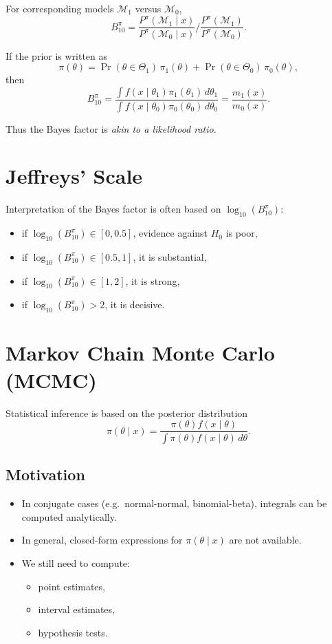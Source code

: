 \documentclass[12pt,oneside]{book}
\numberwithin{equation}{section}
\theoremstyle{definition}
\theoremstyle{plain}
\theoremstyle{remark}
\begin{document}
For corresponding models $\mathcal{M}_1$ versus $\mathcal{M}_0$,
\[
B^{\pi}_{10}
=
\frac{P^{\pi}(\mathcal{M}_1 \mid x)}{P^{\pi}(\mathcal{M}_0 \mid x)}
\Big/
\frac{P^{\pi}(\mathcal{M}_1)}{P^{\pi}(\mathcal{M}_0)}.
\]

If the prior is written as
\[
\pi(\theta)
=
\Pr(\theta \in \Theta_1)\,\pi_1(\theta)
+
\Pr(\theta \in \Theta_0)\,\pi_0(\theta),
\]
then
\[
B^{\pi}_{10}
=
\frac{\int f(x \mid \theta_1)\pi_1(\theta_1)\, d\theta_1}
{\int f(x \mid \theta_0)\pi_0(\theta_0)\, d\theta_0}
=
\frac{m_1(x)}{m_0(x)}.
\]

Thus the Bayes factor is \emph{akin to a likelihood ratio}.

\section{Jeffreys' Scale}

Interpretation of the Bayes factor is often based on $\log_{10}(B^{\pi}_{10})$:

\begin{itemize}
\item if $\log_{10}(B^{\pi}_{10}) \in [0, 0.5]$, evidence against $H_0$ is poor,
\item if $\log_{10}(B^{\pi}_{10}) \in [0.5, 1]$, it is substantial,
\item if $\log_{10}(B^{\pi}_{10}) \in [1, 2]$, it is strong,
\item if $\log_{10}(B^{\pi}_{10}) > 2$, it is decisive.
\end{itemize}

\section{Markov Chain Monte Carlo (MCMC)}

Statistical inference is based on the posterior distribution
\[
\pi(\theta \mid x)
=
\frac{\pi(\theta) f(x \mid \theta)}{\int \pi(\theta) f(x \mid \theta)\, d\theta}.
\]

\subsection*{Motivation}

\begin{itemize}
\item In conjugate cases (e.g.\ normal-normal, binomial-beta), integrals can be computed analytically.
\item In general, closed-form expressions for $\pi(\theta \mid x)$ are not available.
\item We still need to compute:
\begin{itemize}
\item point estimates,
\item interval estimates,
\item hypothesis tests.
\end{itemize}
\end{itemize}
\end{document}

